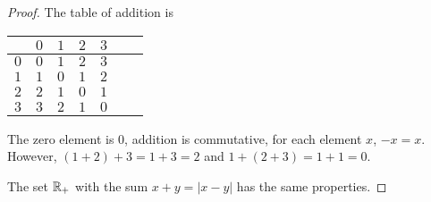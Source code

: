 \begin{proof}
  The table of addition is
  \begin{center}
  \begin{tabular}{l|llllll}
        & $0$ & $1$ & $2$ & $3$ \\ \hline
    $0$ & $0$ & $1$ & $2$ & $3$ \\
    $1$ & $1$ & $0$ & $1$ & $2$ \\
    $2$ & $2$ & $1$ & $0$ & $1$ \\
    $3$ & $3$ & $2$ & $1$ & $0$ \\
  \end{tabular}
  \end{center}

  The zero element is 0, addition is commutative, for each element
  $x$, $-x = x$. However, $(1 + 2) + 3 = 1 + 3 = 2$ and $1 + (2 + 3) =
  1 + 1 = 0$.

  The set $\mathbb{R}_+$ with the sum $x + y = |x - y|$ has the same
  properties.
\end{proof}
